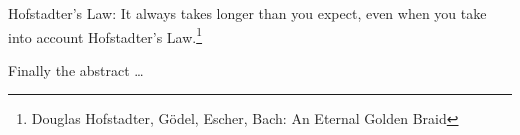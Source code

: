 Hofstadter's Law: It always takes longer than you expect, even when you take into account Hofstadter's Law.\footnote{
	Douglas Hofstadter, G\"odel, Escher, Bach: An Eternal Golden Braid}

Finally the abstract \ldots